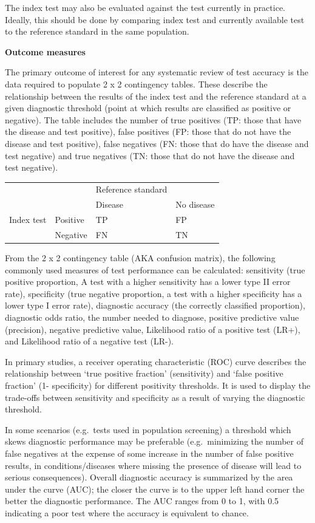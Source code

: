 \documentclass[
  11pt,
  a4paper,
  DIV=11,
  numbers=noendperiod]{scrreprt}
\begin{document}
The index test may also be evaluated against the test currently in
practice. Ideally, this should be done by comparing index test and
currently available test to the reference standard in the same
population.

\textbf{Outcome measures}

The primary outcome of interest for any systematic review of test
accuracy is the data required to populate 2 x 2 contingency tables.
These describe the relationship between the results of the index test
and the reference standard at a given diagnostic threshold (point at
which results are classified as positive or negative). The table
includes the number of true positives (TP: those that have the disease
and test positive), false positives (FP: those that do not have the
disease and test positive), false negatives (FN: those that do have the
disease and test negative) and true negatives (TN: those that do not
have the disease and test negative).

\begin{longtable}[]{@{}llll@{}}
\toprule\noalign{}
\endhead
\bottomrule\noalign{}
\endlastfoot
& & Reference standard & \\
& & Disease & No disease \\
Index test & Positive & TP & FP \\
& Negative & FN & TN \\
\end{longtable}

From the 2 x 2 contingency table (AKA confusion matrix), the following
commonly used measures of test performance can be calculated:
sensitivity (true positive proportion, A test with a higher sensitivity
has a lower type II error rate), specificity (true negative proportion,
a test with a higher specificity has a lower type I error rate),
diagnostic accuracy (the correctly classified proportion), diagnostic
odds ratio, the number needed to diagnose, positive predictive value
(precision), negative predictive value, Likelihood ratio of a positive
test (LR+), and Likelihood ratio of a negative test (LR-).

In primary studies, a receiver operating characteristic (ROC) curve
describes the relationship between `true positive fraction'
(sensitivity) and `false positive fraction' (1- specificity) for
different positivity thresholds. It is used to display the trade-offs
between sensitivity and specificity as a result of varying the
diagnostic threshold.

In some scenarios (e.g.~tests used in population screening) a threshold
which skews diagnostic performance may be preferable (e.g.~minimizing
the number of false negatives at the expense of some increase in the
number of false positive results, in conditions/diseases where missing
the presence of disease will lead to serious consequences). Overall
diagnostic accuracy is summarized by the area under the curve (AUC); the
closer the curve is to the upper left hand corner the better the
diagnostic performance. The AUC ranges from 0 to 1, with 0.5 indicating
a poor test where the accuracy is equivalent to chance.
\end{document}
